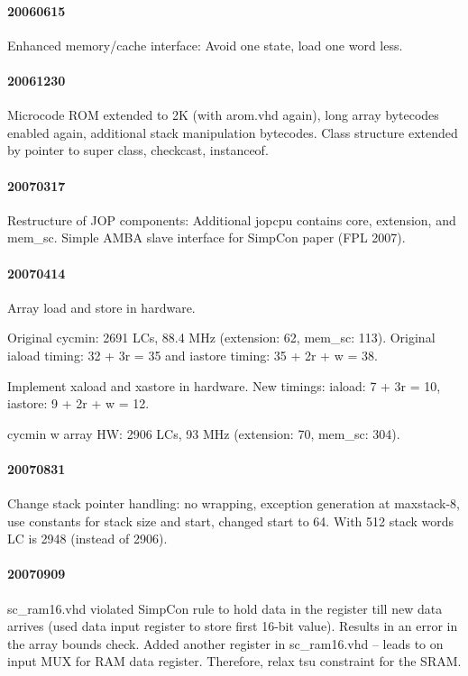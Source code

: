 \documentclass[a4paper,12pt]{scrartcl}
\newcommand{\code}[1]{{\textsf{#1}}}
\begin{document}
\paragraph{20060615}

Enhanced memory/cache interface: Avoid one state, load one word less.

\paragraph{20061230}

Microcode ROM extended to 2K (with arom.vhd again), long array
bytecodes enabled again, additional stack manipulation bytecodes.
Class structure extended by pointer to super class, checkcast,
instanceof.

\paragraph{20070317}

Restructure of JOP components: Additional \code{jopcpu} contains
\code{core}, \code{extension}, and \code{mem\_sc}. Simple AMBA slave
interface for SimpCon paper (FPL 2007).

\paragraph{20070414} Array load and store in hardware.

Original cycmin: 2691 LCs, 88.4 MHz (extension: 62, mem\_sc: 113).
Original iaload timing: 32 + 3r = 35 and iastore timing: 35 + 2r + w
= 38.

Implement xaload and xastore in hardware. New timings: iaload: 7 + 3r
= 10, iastore: 9 + 2r + w = 12.

cycmin w array HW: 2906 LCs, 93 MHz (extension: 70, mem\_sc: 304).

\paragraph{20070831}

Change stack pointer handling: no wrapping, exception generation at
maxstack-8, use constants for stack size and start, changed start to
64. With 512 stack words LC is 2948 (instead of 2906).

\paragraph{20070909} sc\_ram16.vhd violated SimpCon rule to hold data in the
register till new data arrives (used data input register to store
first 16-bit value). Results in an error in the array bounds check.
Added another register in sc\_ram16.vhd -- leads to on input MUX for
RAM data register. Therefore, relax tsu constraint for the SRAM.
\end{document}
